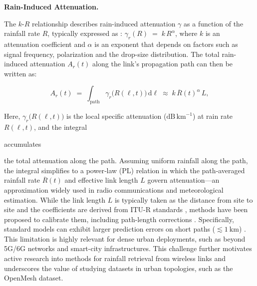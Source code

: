 \documentclass[manuscript]{copernicus}
\newif\ifshowrevisions
\newcommand{\blue}[1]{%
  \ifshowrevisions
    \textcolor{black}{#1}%
  \else
    #1%
  \fi
}
\begin{document}
\blue{\textbf{Rain-Induced Attenuation.}}
The \(k\text{-}R\) relationship describes rain-induced attenuation \(\gamma\) 
as a function of the rainfall rate \(R\), typically expressed as \citep{ITU,Olsen}:
\( \gamma_{r}(R) \;=\; k\,R^{\alpha}\), where \(k\) is an attenuation coefficient and \(\alpha\) is an exponent that depends on factors 
such as signal frequency, polarization and the drop-size distribution. 
The total rain-induced attenuation \(A_r(t)\) along the link’s propagation path can then be written as:

\begin{equation} \label{eq.PL}
    A_{r}(t) 
    \;=\; \int_{\text{path}} \gamma_{r}\bigl(R(\ell,t)\bigr)\,\mathrm{d}\ell  
    \; \approx \; k\,\overline{R}(t)^{\alpha}\, L,
\end{equation}

Here, \(\gamma_{r}\bigl(R(\ell,t)\bigr)\) is the local specific attenuation ($\mathrm{dB}\,\mathrm{km}^{-1}$) at rain rate \(R(\ell,t)\), and the integral \blue{accumulates} the total attenuation along the path. 
Assuming uniform rainfall along the path, the integral simplifies to a power‑law (PL) relation in which the path‑averaged rainfall rate \(\overline{R}(t)\) and effective link length \(L\) govern attenuation—an approximation widely used in radio communications and meteorological estimation.
While the link length $L$ is typically taken as the distance from site to site and the coefficients are derived from ITU-R standards \citep{ITU837}, methods have been proposed to calibrate them, including path-length corrections \citep{ostrometzky2016calibration,da2007prediction,janco2022rain}. Specifically, standard models can exhibit larger prediction errors on short paths ($\lesssim 1\ \mathrm{km}$) \citep{habi2020uncertainties,janco2023city}. This limitation is highly relevant for dense urban deployments, such as beyond 5G/6G networks and smart-city infrastructures. This challenge further motivates active research into methods for rainfall retrieval from wireless links and underscores the value of studying datasets in urban topologies, such as the OpenMesh dataset.



\end{document}
